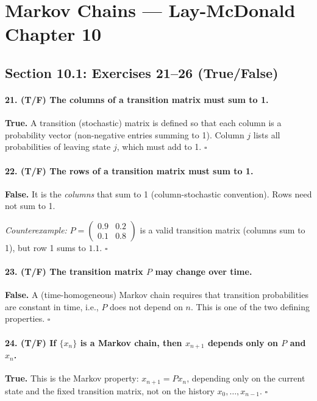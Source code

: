 \documentclass[11pt,a4paper]{article}
\theoremstyle{sol}
\begin{document}
\clearpage
\section{Markov Chains --- Lay-McDonald Chapter 10}

\subsection{Section 10.1: Exercises 21--26 (True/False)}

\paragraph{21. (T/F) The columns of a transition matrix must sum to 1.}
\textbf{True.} A transition (stochastic) matrix is defined so that each column is a probability vector (non-negative entries summing to 1). Column $j$ lists all probabilities of leaving state $j$, which must add to 1. $\square$

\paragraph{22. (T/F) The rows of a transition matrix must sum to 1.}
\textbf{False.} It is the \emph{columns} that sum to 1 (column-stochastic convention). Rows need not sum to 1.

\textit{Counterexample:} $P=\begin{pmatrix}0.9&0.2\\0.1&0.8\end{pmatrix}$ is a valid transition matrix (columns sum to 1), but row 1 sums to $1.1$. $\square$

\paragraph{23. (T/F) The transition matrix $P$ may change over time.}
\textbf{False.} A (time-homogeneous) Markov chain requires that transition probabilities are constant in time, i.e., $P$ does not depend on $n$. This is one of the two defining properties. $\square$

\paragraph{24. (T/F) If $\{x_n\}$ is a Markov chain, then $x_{n+1}$ depends only on $P$ and $x_n$.}
\textbf{True.} This is the Markov property: $x_{n+1}=Px_n$, depending only on the current state and the fixed transition matrix, not on the history $x_0,\ldots,x_{n-1}$. $\square$
\end{document}
